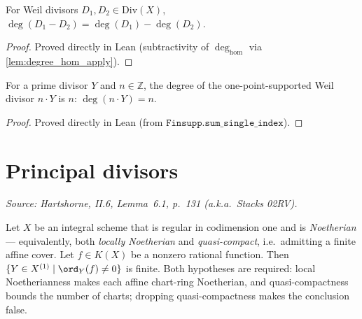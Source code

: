 \begin{lemma}

  \label{lem:degree_sub}
  For Weil divisors \(D_1, D_2 \in \mathrm{Div}(X)\),
  \(\deg(D_1 - D_2) = \deg(D_1) - \deg(D_2)\).
\end{lemma}
\begin{proof}
  Proved directly in Lean (subtractivity of \(\deg_{\mathrm{hom}}\) via
  \ref{lem:degree_hom_apply}).
\end{proof}
\begin{lemma}

  \label{lem:degree_single}
  For a prime divisor \(Y\) and \(n \in \mathbb Z\), the degree of the
  one-point-supported Weil divisor \(n \cdot Y\) is \(n\):
  \(\deg(n \cdot Y) = n\).
\end{lemma}
\begin{proof}
  Proved directly in Lean (from \(\texttt{Finsupp.sum\_single\_index}\)).
\end{proof}
\section{Principal divisors}
\begin{lemma}

  \label{lem:rationalMap_order_finite_support}
  \textit{Source: Hartshorne, II.6, Lemma~6.1, p.~131 (a.k.a.\ Stacks 02RV).}

  Let \(X\) be an integral scheme that is regular in codimension one and is
  \emph{Noetherian} --- equivalently, both \emph{locally Noetherian} and
  \emph{quasi-compact}, i.e.\ admitting a finite affine cover. Let
  \(f \in K(X)\) be a nonzero rational function. Then
  \(\{Y \in X^{(1)} \mid \ord_Y(f) \ne 0\}\) is finite. Both hypotheses are
  required: local Noetherianness makes each affine chart-ring Noetherian, and
  quasi-compactness bounds the number of charts; dropping quasi-compactness
  makes the conclusion false.
\end{lemma}

